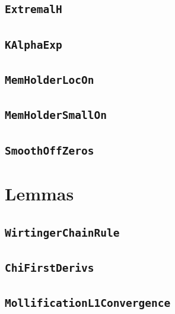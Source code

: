 \documentclass[11pt]{amsart}
\theoremstyle{definition}
\begin{document}
\subsection{\texorpdfstring{\texttt{ExtremalH}}{ExtremalH}}\label{node:ExtremalH}


\subsection{\texorpdfstring{\texttt{KAlphaExp}}{KAlphaExp}}\label{node:KAlphaExp}


\subsection{\texorpdfstring{\texttt{MemHolderLocOn}}{MemHolderLocOn}}\label{node:MemHolderLocOn}


\subsection{\texorpdfstring{\texttt{MemHolderSmallOn}}{MemHolderSmallOn}}\label{node:MemHolderSmallOn}


\subsection{\texorpdfstring{\texttt{SmoothOffZeros}}{SmoothOffZeros}}\label{node:SmoothOffZeros}


\section{Lemmas}
\subsection{\texorpdfstring{\texttt{WirtingerChainRule}}{WirtingerChainRule}}\label{node:WirtingerChainRule}


\subsection{\texorpdfstring{\texttt{ChiFirstDerivs}}{ChiFirstDerivs}}\label{node:ChiFirstDerivs}


\subsection{\texorpdfstring{\texttt{MollificationL1Convergence}}{MollificationL1Convergence}}\label{node:MollificationL1Convergence}

\end{document}
